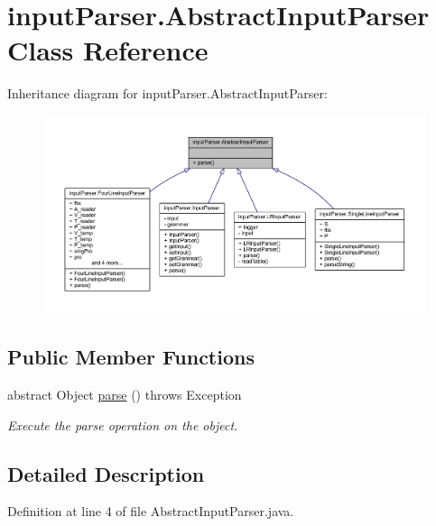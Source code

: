 \hypertarget{classinput_parser_1_1_abstract_input_parser}{\section{input\-Parser.\-Abstract\-Input\-Parser Class Reference}
\label{classinput_parser_1_1_abstract_input_parser}
}


Inheritance diagram for input\-Parser.\-Abstract\-Input\-Parser\-:
\nopagebreak
\begin{figure}[H]
\begin{center}
\leavevmode
\includegraphics[width=350pt]{classinput_parser_1_1_abstract_input_parser__inherit__graph}
\end{center}
\end{figure}
\subsection*{Public Member Functions}
\begin{DoxyCompactItemize}
\item 
abstract Object \hyperlink{classinput_parser_1_1_abstract_input_parser_a548b0f6fa44b7954b79bdd964336bafe}{parse} ()  throws Exception
\begin{DoxyCompactList}\small\item\em Execute the parse operation on the object. \end{DoxyCompactList}\end{DoxyCompactItemize}


\subsection{Detailed Description}


Definition at line 4 of file Abstract\-Input\-Parser.\-java.



